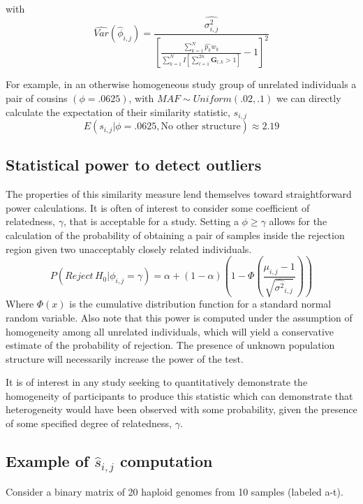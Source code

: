 with 
\[
\hat{Var}\left(\hat{\phi}_{i,j}\right)=\frac{\hat{\sigma_{i,j}^{2}}}{\left[\frac{\sum_{k=1}^{N}\hat{p_{k}}w_{k}}{\sum_{k=1}^{N}I\left[\sum_{l=1}^{2n}\mathbf{G}_{l,k}>1\right]}-1\right]^{2}}
\]

For example, in an otherwise homogeneous study group of unrelated
individuals a pair of cousins $\left(\phi=.0625\right)$, with $MAF\sim Uniform\left(.02,.1\right)$
we can directly calculate the expectation of their similarity statistic,
$s_{i,j}$ 
\[
E\left(s_{i,j}|\phi=.0625,\mbox{No other structure}\right)\approx2.19
\]


\subsection{Statistical power to detect outliers}

The properties of this similarity measure lend themselves toward straightforward
power calculations. It is often of interest to consider some coefficient
of relatedness, $\gamma$, that is acceptable for a study. Setting
a $\phi\ge\gamma$ allows for the calculation of the probability of
obtaining a pair of samples inside the rejection region given two
unacceptably closely related individuals.
\begin{equation}
P\left(Reject\,H_{0}|\phi_{i,j}=\gamma\right)=\alpha+\left(1-\alpha\right)\left(1-\Phi\left(\frac{\mu_{i,j}-1}{\sqrt{\hat{\sigma^{2}}_{i,j}}}\right)\right)\label{eq:Power}
\end{equation}
Where $\Phi\left(x\right)$ is the cumulative distribution function
for a standard normal random variable. Also note that this power is
computed under the assumption of homogeneity among all unrelated individuals,
which will yield a conservative estimate of the probability of rejection.
The presence of unknown population structure will necessarily increase
the power of the test.

It is of interest in any study seeking to quantitatively demonstrate
the homogeneity of participants to produce this statistic which can
demonstrate that heterogeneity would have been observed with some
probability, given the presence of some specified degree of relatedness,
$\gamma$.

\subsection{Example of $\hat{s}_{i,j}$ computation}

Consider a binary matrix of 20 haploid genomes from 10 samples (labeled
a-t).

